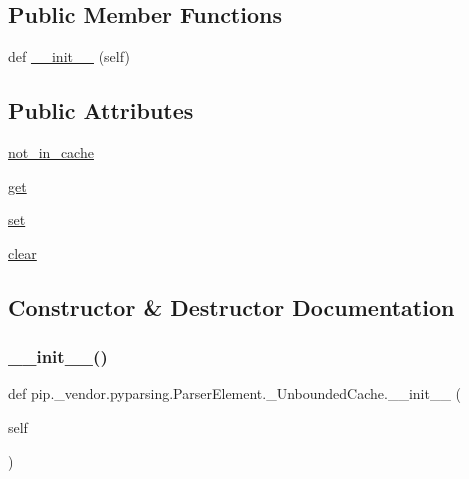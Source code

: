 \subsection*{Public Member Functions}
\begin{DoxyCompactItemize}
\item 
def \hyperlink{classpip_1_1__vendor_1_1pyparsing_1_1ParserElement_1_1__UnboundedCache_a220fbbe8df3651aada0734e42ff026cd}{\+\_\+\+\_\+init\+\_\+\+\_\+} (self)
\end{DoxyCompactItemize}
\subsection*{Public Attributes}
\begin{DoxyCompactItemize}
\item 
\hyperlink{classpip_1_1__vendor_1_1pyparsing_1_1ParserElement_1_1__UnboundedCache_a92c808759069a1c4f2fcf5200ea36924}{not\+\_\+in\+\_\+cache}
\item 
\hyperlink{classpip_1_1__vendor_1_1pyparsing_1_1ParserElement_1_1__UnboundedCache_aa493aa21efc0e2f0234c117ca519383a}{get}
\item 
\hyperlink{classpip_1_1__vendor_1_1pyparsing_1_1ParserElement_1_1__UnboundedCache_abe8bacd816113253c167417ce8fc8413}{set}
\item 
\hyperlink{classpip_1_1__vendor_1_1pyparsing_1_1ParserElement_1_1__UnboundedCache_ada01508f078883d37c2580dc60da3234}{clear}
\end{DoxyCompactItemize}


\subsection{Constructor \& Destructor Documentation}
\mbox{\label{classpip_1_1__vendor_1_1pyparsing_1_1ParserElement_1_1__UnboundedCache_a220fbbe8df3651aada0734e42ff026cd}} 
\subsubsection{\texorpdfstring{\+\_\+\+\_\+init\+\_\+\+\_\+()}{\_\_init\_\_()}}
{\footnotesize\ttfamily def pip.\+\_\+vendor.\+pyparsing.\+Parser\+Element.\+\_\+\+Unbounded\+Cache.\+\_\+\+\_\+init\+\_\+\+\_\+ (\begin{DoxyParamCaption}\item[{}]{self }\end{DoxyParamCaption})}



